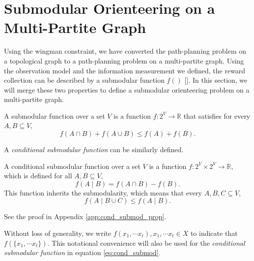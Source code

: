 \section{Submodular Orienteering on a Multi-Partite Graph}
\label{sec:path_dependent_optimization}

Using the wingman constraint, we have converted the path-planning problem on a topological graph to a path-planning problem on a multi-partite graph.
Using the observation model and the information measurement we defined, the reward collection can be described by a submodular function $ f() $ [\cite{goodrich2013toward}].
In this section, we will merge these two properties to define a submodular orienteering problem on a multi-partite graph.


\begin{mydef}
\label{def:submod_func}
A submodular function over a set $ V $ is a function  $ f : 2^{V} \rightarrow \mathbb{R} $ that satisfies for every $ A, B \subseteq V $,
\begin{equation}
\label{eq:submod}
f(A \cap B) + f(A \cup B) \leq f(A) + f(B).
\end{equation}
\end{mydef}

A \emph{conditional submodular function} can be similarly defined.

\begin{mydef}
\label{def:cond_submod_func}
A conditional submodular function over a set $ V $ is a function $ f : 2^{V} \times 2^{V} \rightarrow \mathbb{R} $, which is defined for all $ A, B \subseteq V $, 
\begin{equation}
\label{eq:cond_submod}
f( A \mid B ) = f( A \cap B ) - f( B ).
\end{equation}
This function inherits the submodularity, which means that every $ A, B, C \subseteq V $,
\begin{equation}
\label{eq:cond_submod_prop}
f(A \mid B \cup C) \leq f(A \mid B).
\end{equation}

See the proof in Appendix \ref{app:cond_submod_prop}.

\end{mydef}

Without loss of generality, we write $ f( x_{1} , \cdots x_{t} ), x_{1} , \cdots x_{t} \in X $ to indicate that $ f( \{ x_{1} , \cdots x_{t} \}) $.
This notational convenience will also be used for the \emph{conditional submodular function} in equation \eqref{eq:cond_submod}.


